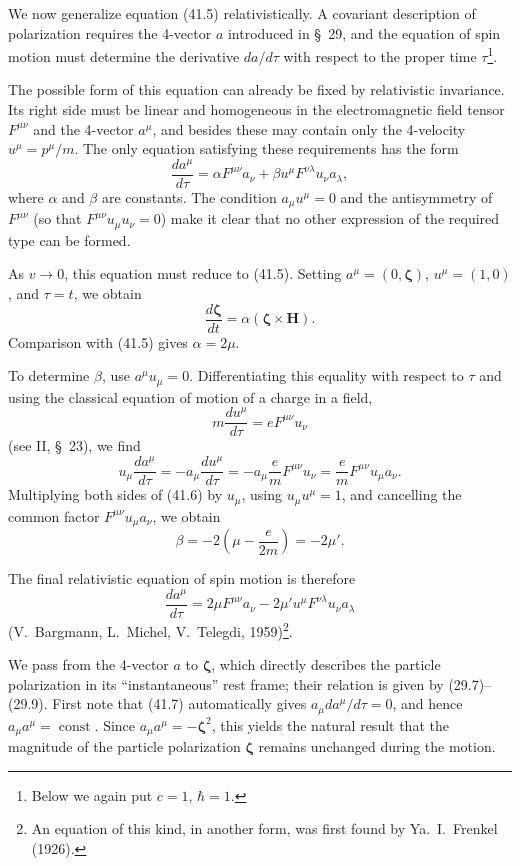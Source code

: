 We now generalize equation (41.5) relativistically. A covariant description of polarization requires the 4-vector $a$ introduced in \S~29, and the equation of spin motion must determine the derivative $da/d\tau$ with respect to the proper time $\tau$\footnote{Below we again put $c=1$, $\hbar=1$.}.

The possible form of this equation can already be fixed by relativistic invariance. Its right side must be linear and homogeneous in the electromagnetic field tensor $F^{\mu\nu}$ and the 4-vector $a^\mu$, and besides these may contain only the 4-velocity $u^\mu=p^\mu/m$. The only equation satisfying these requirements has the form
\begin{equation}
\frac{da^\mu}{d\tau}
=\alpha F^{\mu\nu}a_\nu+\beta u^\mu F^{\nu\lambda}u_\nu a_\lambda,
\tag{41.6}
\end{equation}
where $\alpha$ and $\beta$ are constants. The condition $a_\mu u^\mu=0$ and the antisymmetry of $F^{\mu\nu}$ (so that $F^{\mu\nu}u_\mu u_\nu=0$) make it clear that no other expression of the required type can be formed.

As $v\to0$, this equation must reduce to (41.5). Setting $a^\mu=(0,\boldsymbol\zeta)$, $u^\mu=(1,0)$, and $\tau=t$, we obtain
\[
\frac{d\boldsymbol\zeta}{dt}=\alpha(\boldsymbol\zeta\times\mathbf H).
\]
Comparison with (41.5) gives $\alpha=2\mu$.

To determine $\beta$, use $a^\mu u_\mu=0$. Differentiating this equality with respect to $\tau$ and using the classical equation of motion of a charge in a field,
\[
m\frac{du^\mu}{d\tau}=eF^{\mu\nu}u_\nu
\]
(see II, \S~23), we find
\[
u_\mu\frac{da^\mu}{d\tau}
=-a_\mu\frac{du^\mu}{d\tau}
=-a_\mu\frac emF^{\mu\nu}u_\nu
=\frac emF^{\mu\nu}u_\mu a_\nu.
\]
Multiplying both sides of (41.6) by $u_\mu$, using $u_\mu u^\mu=1$, and cancelling the common factor $F^{\mu\nu}u_\mu a_\nu$, we obtain
\[
\beta=-2\left(\mu-\frac e{2m}\right)=-2\mu'.
\]

The final relativistic equation of spin motion is therefore
\begin{equation}
\frac{da^\mu}{d\tau}=2\mu F^{\mu\nu}a_\nu
-2\mu'u^\mu F^{\nu\lambda}u_\nu a_\lambda
\tag{41.7}
\end{equation}
(V.~Bargmann, L.~Michel, V.~Telegdi, 1959)\footnote{An equation of this kind, in another form, was first found by Ya.~I.~Frenkel (1926).}.

We pass from the 4-vector $a$ to $\boldsymbol\zeta$, which directly describes the particle polarization in its ``instantaneous'' rest frame; their relation is given by (29.7)--(29.9). First note that (41.7) automatically gives $a_\mu da^\mu/d\tau=0$, and hence $a_\mu a^\mu=\operatorname{const}$. Since $a_\mu a^\mu=-\boldsymbol\zeta^2$, this yields the natural result that the magnitude of the particle polarization $\boldsymbol\zeta$ remains unchanged during the motion.

